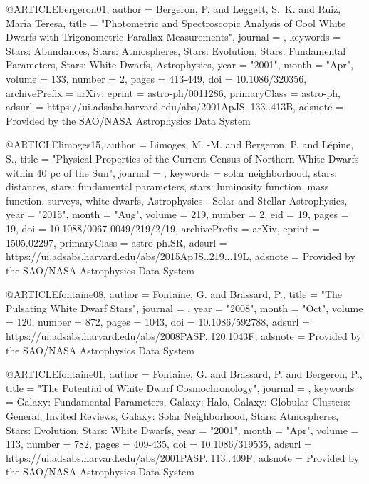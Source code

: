 \documentclass[a4paper,fleqn,usenatbib]{mnras}
\begin{document}
{{{{{{{{{{{@ARTICLE{bergeron01,
       author = {{Bergeron}, P. and {Leggett}, S.~K. and {Ruiz}, Mar{\'\i}a Teresa},
        title = "{Photometric and Spectroscopic Analysis of Cool White Dwarfs with Trigonometric Parallax Measurements}",
      journal = {\apjs},
     keywords = {Stars: Abundances, Stars: Atmospheres, Stars: Evolution, Stars: Fundamental Parameters, Stars: White Dwarfs, Astrophysics},
         year = "2001",
        month = "Apr",
       volume = {133},
       number = {2},
        pages = {413-449},
          doi = {10.1086/320356},
archivePrefix = {arXiv},
       eprint = {astro-ph/0011286},
 primaryClass = {astro-ph},
       adsurl = {https://ui.adsabs.harvard.edu/abs/2001ApJS..133..413B},
      adsnote = {Provided by the SAO/NASA Astrophysics Data System}
}

@ARTICLE{limoges15,
       author = {{Limoges}, M. -M. and {Bergeron}, P. and {L{\'e}pine}, S.},
        title = "{Physical Properties of the Current Census of Northern White Dwarfs within 40 pc of the Sun}",
      journal = {\apjs},
     keywords = {solar neighborhood, stars: distances, stars: fundamental parameters, stars: luminosity function, mass function, surveys, white dwarfs, Astrophysics - Solar and Stellar Astrophysics},
         year = "2015",
        month = "Aug",
       volume = {219},
       number = {2},
          eid = {19},
        pages = {19},
          doi = {10.1088/0067-0049/219/2/19},
archivePrefix = {arXiv},
       eprint = {1505.02297},
 primaryClass = {astro-ph.SR},
       adsurl = {https://ui.adsabs.harvard.edu/abs/2015ApJS..219...19L},
      adsnote = {Provided by the SAO/NASA Astrophysics Data System}
}

@ARTICLE{fontaine08,
       author = {{Fontaine}, G. and {Brassard}, P.},
        title = "{The Pulsating White Dwarf Stars}",
      journal = {\pasp},
         year = "2008",
        month = "Oct",
       volume = {120},
       number = {872},
        pages = {1043},
          doi = {10.1086/592788},
       adsurl = {https://ui.adsabs.harvard.edu/abs/2008PASP..120.1043F},
      adsnote = {Provided by the SAO/NASA Astrophysics Data System}
}

@ARTICLE{fontaine01,
       author = {{Fontaine}, G. and {Brassard}, P. and {Bergeron}, P.},
        title = "{The Potential of White Dwarf Cosmochronology}",
      journal = {\pasp},
     keywords = {Galaxy: Fundamental Parameters, Galaxy: Halo, Galaxy: Globular Clusters: General, Invited Reviews, Galaxy: Solar Neighborhood, Stars: Atmospheres, Stars: Evolution, Stars: White Dwarfs},
         year = "2001",
        month = "Apr",
       volume = {113},
       number = {782},
        pages = {409-435},
          doi = {10.1086/319535},
       adsurl = {https://ui.adsabs.harvard.edu/abs/2001PASP..113..409F},
      adsnote = {Provided by the SAO/NASA Astrophysics Data System}
}

}}}}}}}}}}}
\end{document}
